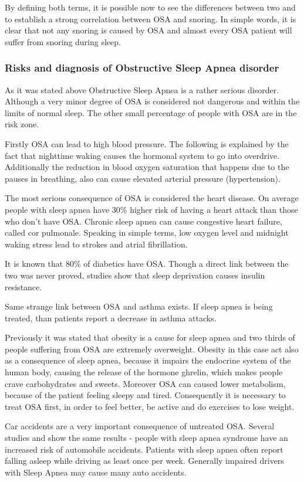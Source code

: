 By defining both terms, it is possible now to see the differences between two and to establish a strong correlation between OSA and snoring. In simple words, it is clear that not any snoring is caused by OSA and almost every OSA patient will suffer from snoring during sleep.

\subsubsection{Risks and diagnosis of Obstructive Sleep Apnea disorder}
As it was stated above Obstructive Sleep Apnea is a rather serious disorder. Although a very minor degree of OSA is considered not dangerous and within the limits of normal sleep. The other small percentage of people with OSA are in the risk zone.

Firstly OSA can lead to high blood pressure. The following is explained by the fact that nighttime waking causes the hormonal system to go into overdrive. Additionally the reduction in blood oxygen saturation that happens due to the pauses in breathing, also can cause elevated arterial pressure (hypertension).

The most serious consequence of OSA is considered the heart disease. On average people with sleep apnea have 30\% higher risk of having a heart attack than those who don't have OSA. Chronic sleep apnea can cause congestive heart failure, called cor pulmonale. Speaking in simple terms, low oxygen level and midnight waking stress lead to strokes and atrial fibrillation.

It is known that 80\% of diabetics have OSA. Though a direct link between the two was never proved, studies show that sleep deprivation causes insulin resistance. 

Same strange link between OSA and asthma exists. If sleep apnea is being treated, than patients report a decrease in asthma attacks. 

Previously it was stated that obesity is a cause for sleep apnea and two thirds of people suffering from OSA are extremely overweight. Obesity in this case act also as a consequence of sleep apnea, because it impairs the endocrine system of the human body, causing the release of the hormone ghrelin, which makes people crave carbohydrates and sweets. Moreover OSA can caused lower metabolism, because of the patient feeling sleepy and tired. Consequently it is necessary to treat OSA first, in order to feel better, be active and do exercises to lose weight.

Car accidents are a very important consequence of untreated OSA. Several studies \cite{accidents} and \cite{accidents2} show the same results - people with sleep apnea syndrome have an increased risk of automobile accidents. Patients with sleep apnea often report falling asleep while driving as least once per week. Generally impaired drivers with Sleep Apnea may cause many auto accidents. 

